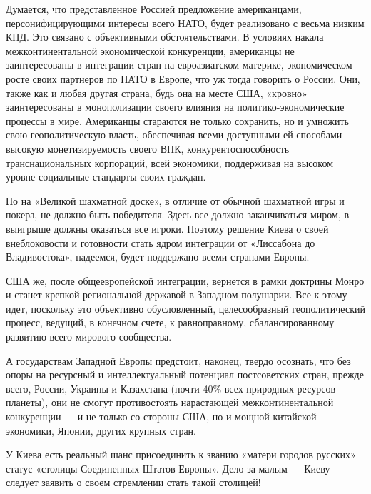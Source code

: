 Думается, что представленное Россией предложение американцами,
персонифицирующими интересы всего НАТО, будет реализовано с весьма низким КПД.
Это связано с объективными обстоятельствами. В условиях накала
межконтинентальной экономической конкуренции, американцы не заинтересованы в
интеграции стран на евроазиатском материке, экономическом росте своих партнеров
по НАТО в Европе, что уж тогда говорить о России. Они, также как и любая другая
страна, будь она на месте США, «кровно» заинтересованы в монополизации своего
влияния на политико-экономические процессы в мире. Американцы стараются не
только сохранить, но и умножить свою геополитическую власть, обеспечивая всеми
доступными ей способами высокую монетизируемость своего ВПК,
конкурентоспособность транснациональных корпораций, всей экономики, поддерживая
на высоком уровне социальные стандарты своих граждан.

Но на «Великой шахматной доске», в отличие от обычной шахматной игры и покера,
не должно быть победителя. Здесь все должно заканчиваться миром, в выигрыше
должны оказаться все игроки. Поэтому решение Киева о своей внеблоковости и
готовности стать ядром интеграции от «Лиссабона до Владивостока», надеемся,
будет поддержано всеми странами Европы.

США же, после общеевропейской интеграции, вернется в рамки доктрины Монро и
станет крепкой региональной державой в Западном полушарии. Все к этому идет,
поскольку это объективно обусловленный, целесообразный геополитический процесс,
ведущий, в конечном счете, к равноправному, сбалансированному развитию всего
мирового сообщества.

А государствам Западной Европы предстоит, наконец, твердо осознать, что без
опоры на ресурсный и интеллектуальный потенциал постсоветских стран, прежде
всего, России, Украины и Казахстана (почти 40\% всех природных ресурсов
планеты), они не смогут противостоять нарастающей межконтинентальной
конкуренции — и не только со стороны США, но и мощной китайской экономики,
Японии, других крупных стран.

\begin{zznagolos}
У Киева есть реальный шанс присоединить к званию «матери городов русских»
статус «столицы Соединенных Штатов Европы». Дело за малым — Киеву следует
заявить о своем стремлении стать такой столицей!
\end{zznagolos}

